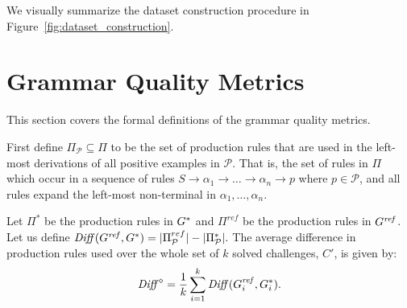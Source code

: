We visually summarize the dataset construction procedure in Figure~\ref{fig:dataset_construction}.

\section{Grammar Quality Metrics}
\label{appendix:grammar_quality_metrics}
This section covers the formal definitions of the grammar quality metrics. 


First define $\Pi_\mathcal{P} \subseteq \Pi$ to be the set of production rules that are used in the left-most derivations of all positive examples in $\mathcal{P}$. That is, the set of rules in $\Pi$ which occur in a sequence of rules $S \rightarrow \alpha_1 \rightarrow \ldots \rightarrow \alpha_n \rightarrow p $ where $p \in \mathcal{P}$, and all rules expand the left-most non-terminal in $\alpha_1, \ldots, \alpha_n$. 



Let $\Pi^*$ be the production rules in $G^*$ and $\Pi^{ref}$ be the production rules in $G^{\mathit{ref}}$. Let us define ${\mathit{Diff}}(G^{\mathit{ref}},G^*) =  |\Pi^{ref}_\mathcal{P}| - |\Pi^*_\mathcal{P}|.$
%
%
The average difference in production rules used over the whole set of $k$ solved challenges, $C'$, is given by: 
$$
{\mathit{Diff}}^\diamond = \frac{1}{k} \sum_{i=1}^k {\mathit{Diff}}(G^{\mathit{ref}}_i,G^*_i).
$$




